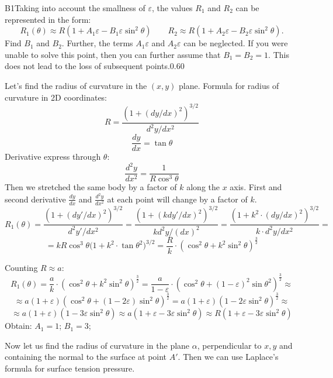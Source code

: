 \documentclass[11pt,a4paper]{article}
\begin{document}
\begin{solcard}{B1}{Taking into account the smallness of $\varepsilon$, the values $R_1$ and $R_2$ can be represented in the form: \begin{equation*} R_1(\theta)\approx R(1+A_1\varepsilon-B_1\varepsilon\sin^2\theta)\qquad R_2\approx R(1+A_2\varepsilon-B_2\varepsilon\sin^2\theta){.} \end{equation*} Find $B_1$ and $B_2$. Further, the terms $A_1\varepsilon$ and $A_2\varepsilon$ can be neglected. If you were unable to solve this point, then you can further assume that $B_1=B_2=1$. This does not lead to the loss of subsequent points.}{0.60}

Let's find the radius of curvature in the $(x, y)$ plane. Formula for radius of curvature in 2D coordinates: $$R = \frac{(1 + (dy/dx)^2)^{3/2}}{d^2y/dx^2}$$ $$\frac{dy}{dx} = \tan{\theta}$$Derivative express through $\theta$: $$\frac{d^2y}{dx^2} = \frac{1}{R \cos^3{\theta}}$$ Then we stretched the same body by a factor of $k$ along the $x$ axis. First and second derivative $\frac{dy}{d x}$ and $\frac{d^2y}{dx^2}$ at each point will change by a factor of $k$. $$R_1(\theta) = \frac{(1 + (dy'/dx)^2)^{3/2}}{d^2y'/dx^2} = \frac{(1 + (kdy'/dx)^2)^{3/2}}{kd^2y/(dx)^2} = \frac{(1 + k^2 \cdot (dy/dx)^2)^{3/2}}{k\cdot d^2y/dx^2} = $$ $$= k R \cos^3{\theta}\big(1 + k^2 \cdot \tan{\theta}^2\big)^{3/2} = \frac{R}{k} \cdot (\cos^2{\theta} + k^2 \sin^2{\theta})^\frac{3}{2}$$


Counting $R \approx a$: $$R_1(\theta)= \frac{a}{k} \cdot (\cos^2{\theta} + k^2 \sin^2{\theta})^\frac{3}{2} = \frac{a}{1-\varepsilon} \cdot (\cos^2{\theta} + (1 - \varepsilon)^2 \sin{\theta}^2)^\frac{3}{2} \approx$$ $$\approx a (1 + \varepsilon) (\cos^2{\theta} + (1 - 2\varepsilon) \sin^2{\theta})^\frac{3}{2} = a (1 + \varepsilon) (1 - 2\varepsilon  \sin^2{\theta})^\frac{3}{2} \approx$$$$\approx a (1 + \varepsilon) (1 - 3\varepsilon  \sin^2{\theta}) \approx a(1 + \varepsilon - 3\varepsilon\sin^2{\theta}) \approx R (1 + \varepsilon - 3\varepsilon\sin^2{\theta}) $$Obtain: $A_1 = 1$; $B_1 = 3$;


Now let us find the radius of curvature in the plane $\alpha$, perpendicular to $x, y$ and containing the normal to the surface at point $A'$. Then we can use Laplace's formula for surface tension pressure.



\end{solcard}
\end{document}
